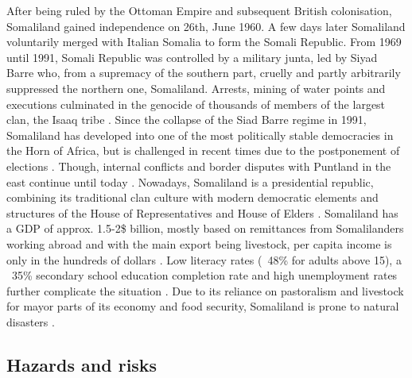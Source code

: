 After being ruled by the Ottoman Empire and subsequent British colonisation, Somaliland gained independence on 26th, June 1960. A few days later Somaliland voluntarily merged with Italian Somalia to form the Somali Republic. From 1969 until 1991, Somali Republic was controlled by a military junta, led by Siyad Barre who, from a supremacy of the southern part, cruelly and partly arbitrarily suppressed the northern one, Somaliland. Arrests, mining of water points and executions culminated in the genocide of thousands of members of the largest clan, the Isaaq tribe \autocite{peiferStoppingMassKillings2009,republicofsomaliaCountryProfile20212021}. Since the collapse of the Siad Barre regime in 1991, Somaliland has developed into one of the most politically stable democracies in the Horn of Africa, but is challenged in recent times due to the postponement of elections \autocite{bbcSomalilandProfile2022, fortiPocketStabilityUnderstanding2011}. Though, internal conflicts and border disputes with Puntland in the east continue until today \autocite{filhoDEMOCRACYAFRICAOUTSTANDING2021}. Nowadays, Somaliland is a presidential republic, combining its traditional clan culture with modern democratic elements and structures of the House of Representatives and House of Elders \autocite{salemTerritorialDiagnosticReport2016}.\newline
Somaliland has a GDP of approx. 1.5-2\$ billion, mostly based on remittances from Somalilanders working abroad and with the main export being livestock, per capita income is only in the hundreds of dollars \autocite{klobucistaSomalilandHornAfrica2018, republicofsomaliaCountryProfile20212021, worldbankNewWorldBank2014}. Low literacy rates (~48\% for adults above 15), a ~35\% secondary school education completion rate and high unemployment rates further complicate the situation \autocite{republicofsomaliaCountryProfile20212021,worldbankNewWorldBank2014}. Due to its reliance on pastoralism and livestock for mayor parts of its economy and food security, Somaliland is prone to natural disasters \autocite{usaidEconomicsResilienceDrought2018}.


\subsection{Hazards and risks}


